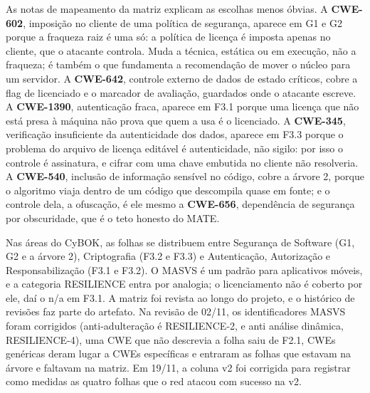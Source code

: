 As notas de mapeamento da matriz explicam as escolhas menos óbvias. A \textbf{CWE-602}, imposição no cliente de uma política de segurança, aparece em G1 e G2 porque a fraqueza raiz é uma só: a política de licença é imposta apenas no cliente, que o atacante controla. Muda a técnica, estática ou em execução, não a fraqueza; é também o que fundamenta a recomendação de mover o núcleo para um servidor. A \textbf{CWE-642}, controle externo de dados de estado críticos, cobre a flag de licenciado e o marcador de avaliação, guardados onde o atacante escreve. A \textbf{CWE-1390}, autenticação fraca, aparece em F3.1 porque uma licença que não está presa à máquina não prova que quem a usa é o licenciado. A \textbf{CWE-345}, verificação insuficiente da autenticidade dos dados, aparece em F3.3 porque o problema do arquivo de licença editável é autenticidade, não sigilo: por isso o controle é assinatura, e cifrar com uma chave embutida no cliente não resolveria. A \textbf{CWE-540}, inclusão de informação sensível no código, cobre a árvore 2, porque o algoritmo viaja dentro de um código que descompila quase em fonte; e o controle dela, a ofuscação, é ele mesmo a \textbf{CWE-656}, dependência de segurança por obscuridade, que é o teto honesto do MATE.

Nas áreas do CyBOK, as folhas se distribuem entre Segurança de Software (G1, G2 e a árvore 2), Criptografia (F3.2 e F3.3) e Autenticação, Autorização e Responsabilização (F3.1 e F3.2). O MASVS é um padrão para aplicativos móveis, e a categoria RESILIENCE entra por analogia; o licenciamento não é coberto por ele, daí o n/a em F3.1. A matriz foi revista ao longo do projeto, e o histórico de revisões faz parte do artefato. Na revisão de 02/11, os identificadores MASVS foram corrigidos (anti-adulteração é RESILIENCE-2, e anti análise dinâmica, RESILIENCE-4), uma CWE que não descrevia a folha saiu de F2.1, CWEs genéricas deram lugar a CWEs específicas e entraram as folhas que estavam na árvore e faltavam na matriz. Em 19/11, a coluna v2 foi corrigida para registrar como medidas as quatro folhas que o red atacou com sucesso na v2.
